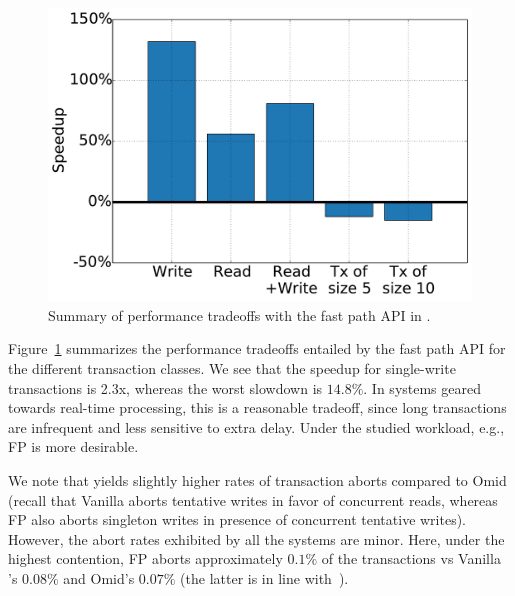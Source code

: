 \begin{figure}[h!]
\centering
\includegraphics[width=.45\textwidth]{figs/speedup.pdf}
\caption{Summary of performance tradeoffs with the fast path API in {\sys}.}
\label{fig:fp-tradeoff}
\end{figure}

Figure~\ref{fig:fp-tradeoff} summarizes the performance tradeoffs entailed by the fast path API
for the different transaction classes. 
We see that the speedup for single-write transactions is 2.3x, whereas the worst slowdown is $14.8\%$. 
In systems geared towards real-time processing, this is a reasonable tradeoff, since long transactions 
are infrequent and less sensitive to extra delay. Under the studied workload, e.g.,   FP \sys\/ is more desirable. 

We note that \sys\/ yields slightly higher rates of transaction aborts compared to Omid (recall 
that Vanilla \sys\/ aborts tentative writes in favor of concurrent reads, whereas FP \sys\/ also aborts
singleton writes in presence of concurrent tentative writes). However, the abort rates exhibited by all  
the systems are minor. Here, under the highest contention, FP \sys\/ aborts approximately $0.1\%$ 
of the transactions vs Vanilla \sys's $0.08\%$ and Omid's $0.07\%$ (the latter  is in line 
with~\cite{Omid2017}).  

